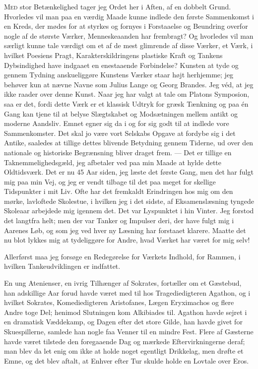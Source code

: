 \documentclass[12pt,a4paper,openany]{book}
\newcommand{\opage}[1]{\marginnote{\footnotesize\textit{[#1]}}}
\newcommand{\whiteline}{\par\vspace{\baselineskip}\par}
\begin{document}
M\textsc{ed} stor Betænkelighed tager jeg Ordet her i Aften, af
en dobbelt Grund. Hvorledes vil man paa en værdig
Maade kunne indlede den første Sammenkomst i en Kreds, der
mødes for at styrkes og fornyes i Forstaaelse og Beundring
overfor nogle af de største Værker, Menneskeaanden har frembragt?
Og hvorledes vil man særligt kunne tale værdigt om et
af de mest glimrende af disse Værker, et Værk, i hvilket Poesiens
Pragt, Karakterskildringens plastiske Kraft og Tankens
Dybsindighed have indgaaet en enestaaende Forbindelse? Kunsten
at tyde og gennem Tydning anskueliggøre Kunstens Værker
staar højt herhjemme; jeg behøver kun at nævne Navne som
Julius Lange og Georg Brandes. Jeg véd, at jeg ikke raader
over denne Kunst. Naar jeg har valgt at tale om Platons Symposion,
saa er det, fordi dette Værk er et klassisk Udtryk for
græsk Tænkning og paa én Gang kan tjene til at belyse Slægtskabet
og Modsætningen mellem antikt og moderne Aandsliv.
Emnet egner sig da i og for sig godt til at indlede vore Sammenkomster.
Det skal jo være vort Selskabs Opgave at fordybe sig
i det Antike, saaledes at tillige dettes blivende Betydning gennem
Tiderne, ud over den nationale og historiske Begrænsning bliver
draget frem. --- Det er tillige en Taknemmelighedsgæld, jeg afbetaler
ved paa min Maade at hylde dette Oldtidsværk. Det er
nu 45 Aar siden, jeg læste det første Gang, men det har fulgt
mig paa min Vej, og jeg er vendt tilbage til det paa meget for%
\setcounter{footnote}{0}%
\opage{84}skellige Tidspunkter i mit Liv. Ofte har det fremkaldt Erindringen
hos mig om den mørke, lavloftede Skolestue, i hvilken
jeg i det sidste, af Eksamenslæsning tyngede Skoleaar arbejdede
mig igennem det. Det var Lyspunktet i hin Vinter. Jeg forstod
det langtfra helt; men der var Tanker og Impulser deri, der
have fulgt mig i Aarenes Løb, og som jeg ved hver ny Læsning
har forstaaet klarere. Maatte det nu blot lykkes mig at tydeliggøre
for Andre, hvad Værket har været for mig selv!

Allerførst maa jeg forsøge en Redegørelse for Værkets Indhold,
for Rammen, i hvilken Tankeudviklingen er indfattet.

\whiteline

En ung Atenienser, en ivrig Tilhænger af Sokrates, fortæller
om et Gæstebud, han adskillige Aar forud havde været med til
hos Tragediedigteren Agathon, og i hvilket Sokrates, Komediedigteren
Aristofanes, Lægen Eryximachos og flere Andre toge
Del; henimod Slutningen kom Alkibiades til. Agathon havde
sejret i en dramatisk Væddekamp, og Dagen efter det store
Gilde, han havde givet for Skuespillerne, samlede han nogle faa
Venner til en mindre Fest. Flere af Gæsterne havde været tilstede
den foregaaende Dag og mærkede Eftervirkningerne deraf;
man blev da let enig om ikke at holde noget egentligt Drikkelag,
men drøfte et Emne, og det blev aftalt, at Enhver efter Tur
skulde holde en Lovtale over Eros.
\end{document}
